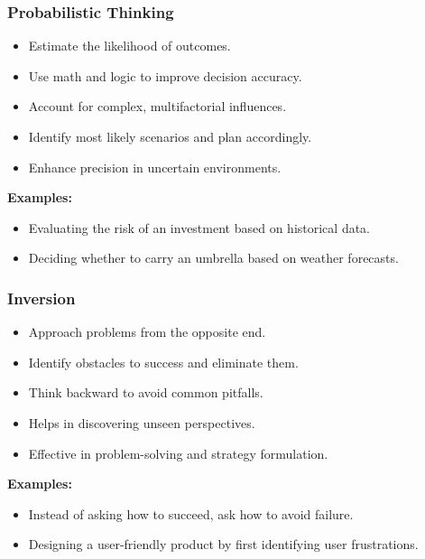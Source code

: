 \begin{frame}[fragile]\frametitle{Probabilistic Thinking}
\begin{itemize}
    \item Estimate the likelihood of outcomes.
    \item Use math and logic to improve decision accuracy.
    \item Account for complex, multifactorial influences.
    \item Identify most likely scenarios and plan accordingly.
    \item Enhance precision in uncertain environments.
\end{itemize}
\textbf{Examples:}
\begin{itemize}
    \item Evaluating the risk of an investment based on historical data.
    \item Deciding whether to carry an umbrella based on weather forecasts.
\end{itemize}
\end{frame}

\begin{frame}[fragile]\frametitle{Inversion}
\begin{itemize}
    \item Approach problems from the opposite end.
    \item Identify obstacles to success and eliminate them.
    \item Think backward to avoid common pitfalls.
    \item Helps in discovering unseen perspectives.
    \item Effective in problem-solving and strategy formulation.
\end{itemize}
\textbf{Examples:}
\begin{itemize}
    \item Instead of asking how to succeed, ask how to avoid failure.
    \item Designing a user-friendly product by first identifying user frustrations.
\end{itemize}
\end{frame}

